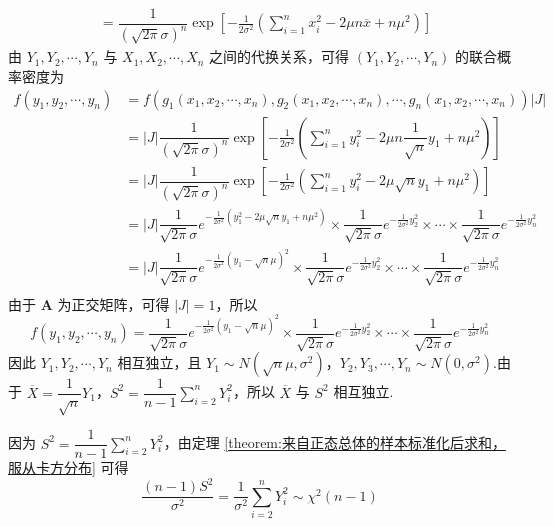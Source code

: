 \begin{myproof}
$$\begin{aligned}
        &= \dfrac{1}{(\sqrt{2 \pi} \sigma)^n} \exp{ \left[-\frac{1}{2 \sigma^2} \left( \sum_{i=1}^{n} x_i^2 - 2 \mu n \overline{x} + n \mu^2 \right) \right] }
    \end{aligned}
    $$
    由 $Y_1, Y_2, \cdots, Y_n$ 与 $X_1,X_2,\cdots,X_n$ 之间的代换关系，可得 $(Y_1, Y_2, \cdots, Y_n)$ 的联合概率密度为
    $$
    \begin{aligned}
        f(y_1, y_2, \cdots, y_n) &= f(g_1(x_1, x_2, \cdots, x_n), g_2(x_1, x_2, \cdots, x_n), \cdots, g_n(x_1, x_2, \cdots, x_n)) |J| \\
        &= |J| \dfrac{1}{(\sqrt{2 \pi} \sigma)^n} \exp{ \left[-\frac{1}{2 \sigma^2} \left( \sum_{i=1}^{n} y_i^2 - 2 \mu n \dfrac{1}{\sqrt{n}} y_1 + n \mu^2 \right) \right] } \\
        &= |J| \dfrac{1}{(\sqrt{2 \pi} \sigma)^n} \exp{ \left[-\frac{1}{2 \sigma^2} \left( \sum_{i=1}^{n} y_i^2 - 2 \mu \sqrt{n} y_1 + n \mu^2 \right) \right] } \\
        &= |J| \dfrac{1}{\sqrt{2 \pi} \sigma} e^{-\frac{1}{2 \sigma^2} (y_1^2 - 2 \mu \sqrt{n} y_1 + n \mu^2)} \times \dfrac{1}{\sqrt{2 \pi} \sigma} e^{-\frac{1}{2 \sigma^2} y_2^2} \times \cdots \times \dfrac{1}{\sqrt{2 \pi} \sigma} e^{-\frac{1}{2 \sigma^2} y_n^2} \\
        &= |J| \dfrac{1}{\sqrt{2 \pi} \sigma} e^{-\frac{1}{2 \sigma^2} (y_1 - \sqrt{n} \mu)^2} \times \dfrac{1}{\sqrt{2 \pi} \sigma} e^{-\frac{1}{2 \sigma^2} y_2^2} \times \cdots \times \dfrac{1}{\sqrt{2 \pi} \sigma} e^{-\frac{1}{2 \sigma^2} y_n^2} \\
    \end{aligned}
    $$
    由于 $\boldsymbol{A}$ 为正交矩阵，可得 $|J|=1$，所以
    $$
    f(y_1, y_2, \cdots, y_n) = \dfrac{1}{\sqrt{2 \pi} \sigma} e^{-\frac{1}{2 \sigma^2} (y_1 - \sqrt{n} \mu)^2} \times \dfrac{1}{\sqrt{2 \pi} \sigma} e^{-\frac{1}{2 \sigma^2} y_2^2} \times \cdots \times \dfrac{1}{\sqrt{2 \pi} \sigma} e^{-\frac{1}{2 \sigma^2} y_n^2}
    $$
    因此 $Y_1, Y_2, \cdots, Y_n$ 相互独立，且 $Y_1 \sim N(\sqrt{n} \mu, \sigma^2)$，$Y_2, Y_3, \cdots, Y_n \sim N(0, \sigma^2)$.由于 $\overline{X} = \dfrac{1}{\sqrt{n}} Y_1$，$S^2 = \dfrac{1}{n-1} \displaystyle\sum_{i=2}^n Y_i^2$，所以 $\overline{X}$ 与 $S^2$ 相互独立.

    因为 $S^2 = \dfrac{1}{n-1} \displaystyle\sum_{i=2}^n Y_i^2$，由定理 \ref{theorem:来自正态总体的样本标准化后求和，服从卡方分布} 可得
    $$
    \dfrac{(n-1) S^2}{\sigma^2} = \dfrac{1}{\sigma^2} \sum_{i=2}^n Y_i^2 \sim \chi^2(n-1)
    $$
\end{myproof}

